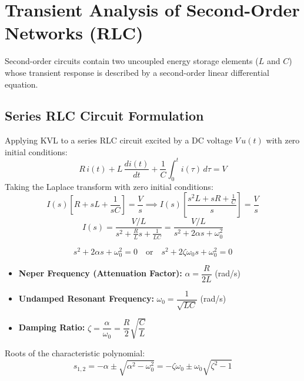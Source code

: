 \documentclass[12pt,a4paper]{article}
\begin{document}
\section{Transient Analysis of Second-Order Networks (RLC)}

Second-order circuits contain two uncoupled energy storage elements ($L$ and $C$) whose transient response is described by a second-order linear differential equation.

\subsection{Series RLC Circuit Formulation}

Applying KVL to a series RLC circuit excited by a DC voltage $V\,u(t)$ with zero initial conditions:
\begin{equation}
  R\,i(t) + L\,\frac{di(t)}{dt} + \frac{1}{C}\int_0^t i(\tau)\,d\tau = V
\end{equation}
Taking the Laplace transform with zero initial conditions:
\begin{equation}
  I(s)\left[R + sL + \frac{1}{sC}\right] = \frac{V}{s} \implies I(s)\left[\frac{s^2 L + s R + \frac{1}{C}}{s}\right] = \frac{V}{s}
\end{equation}
\begin{equation}
  I(s) = \frac{V/L}{s^2 + \frac{R}{L}s + \frac{1}{LC}} = \frac{V/L}{s^2 + 2\alpha s + \omega_0^2}
\end{equation}

\begin{tcolorbox}[formulabox, title={\textbf{Standard Second-Order Characteristic Parameters}}]
\begin{equation}
  s^2 + 2\alpha s + \omega_0^2 = 0 \quad \text{or} \quad s^2 + 2\zeta\omega_0 s + \omega_0^2 = 0
\end{equation}
\begin{itemize}[leftmargin=*]
  \item \textbf{Neper Frequency (Attenuation Factor):} $\alpha = \dfrac{R}{2L}$ (rad/s)
  \item \textbf{Undamped Resonant Frequency:} $\omega_0 = \dfrac{1}{\sqrt{LC}}$ (rad/s)
  \item \textbf{Damping Ratio:} $\zeta = \dfrac{\alpha}{\omega_0} = \dfrac{R}{2}\sqrt{\dfrac{C}{L}}$
\end{itemize}
Roots of the characteristic polynomial:
\begin{equation}
  s_{1,2} = -\alpha \pm \sqrt{\alpha^2 - \omega_0^2} = -\zeta\omega_0 \pm \omega_0\sqrt{\zeta^2 - 1}
\end{equation}
\end{tcolorbox}
\end{document}
